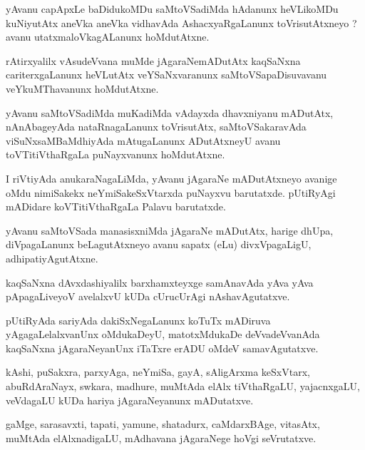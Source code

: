 \documentclass{article}
\begin{document}
\begin{mn}%
yAvanu capApxLe baDidukoMDu saMtoVSadiMda hAdanunx heVLikoMDu kuNiyutAtx aneVka aneVka vidhavAda 
AshacxyaRgaLanunx toVrisutAtxneyo ? avanu utatxmaloVkagALanunx hoMdutAtxne.
\end{mn}

\begin{mn}%
rAtirxyalilx vAsudeVvana muMde jAgaraNemADutAtx kaqSaNxna cariterxgaLanunx heVLutAtx 
veYSaNxvaranunx saMtoVSapaDisuvavanu veYkuMThavanunx hoMdutAtxne.
\end{mn}

\begin{mn}%
yAvanu saMtoVSadiMda muKadiMda vAdayxda dhavxniyanu mADutAtx, nAnAbageyAda nataRnagaLanunx 
toVrisutAtx, saMtoVSakaravAda viSuNxsaMBaMdhiyAda mAtugaLanunx ADutAtxneyU avanu toVTitiVthaRgaLa 
puNayxvanunx hoMdutAtxne.
\end{mn}

\begin{mn}%
I riVtiyAda anukaraNagaLiMda, yAvanu jAgaraNe mADutAtxneyo avanige oMdu nimiSakekx 
neYmiSakeSxVtarxda puNayxvu barutatxde. pUtiRyAgi mADidare koVTitiVthaRgaLa Palavu barutatxde.
\end{mn}

\begin{mn}%
yAvanu saMtoVSada manasisxniMda jAgaraNe mADutAtx, harige dhUpa, diVpagaLanunx beLagutAtxneyo avanu 
sapatx (eLu) divxVpagaLigU, adhipatiyAgutAtxne.
\end{mn}

\begin{mn}%
kaqSaNxna dAvxdashiyalilx barxhamxteyxge samAnavAda yAva yAva pApagaLiveyoV avelalxvU kUDa 
cUrucUrAgi nAshavAgutatxve.
\end{mn}

\begin{mn}%
pUtiRyAda sariyAda dakiSxNegaLanunx koTuTx mADiruva yAgagaLelalxvanUnx oMdukaDeyU, matotxMdukaDe 
deVvadeVvanAda kaqSaNxna jAgaraNeyanUnx iTaTxre erADU oMdeV samavAgutatxve.
\end{mn}

\begin{mn}%
kAshi, puSakxra, parxyAga, neYmiSa, gayA, sAligArxma keSxVtarx, abuRdAraNayx, swkara, madhure, 
muMtAda elAlx tiVthaRgaLU, yajacnxgaLU, veVdagaLU kUDa hariya jAgaraNeyanunx mADutatxve.
\end{mn}

\begin{mn}%
gaMge, sarasavxti, tapati, yamune, shatadurx, caMdarxBAge, vitasAtx, muMtAda elAlxnadigaLU, 
mAdhavana jAgaraNege hoVgi seVrutatxve.
\end{mn}
\end{document}
